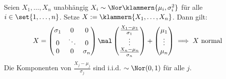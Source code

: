 \begin{beispiel}\label{beisp5.2}
	Seien $X_1,\ldots,X_n$ unabhängig $X_i\sim\Nor\klammern{\mu_i,\sigma_i^2}$ für alle $i\in\set{1,\ldots,n}$.
	Setze $X:=\klammern{X_1,\ldots,X_n}$.
	Dann gilt:
	\begin{align*}
		X
		\overset{}{=}
		\begin{pmatrix}
			\sigma_1 & 0 & 0\\
			0 & \ddots & 0\\
			0 & 0 & \sigma_n
		\end{pmatrix}\mal\begin{pmatrix}
			\frac{X_1-\mu_1}{\sigma_1}\\
			\vdots\\
			\frac{X_n-\mu_n}{\sigma_n}
		\end{pmatrix}
		+\begin{pmatrix}
			\mu_1\\
			\vdots\\
			\mu_n
		\end{pmatrix}
		\implies X\text{ normal}
	\end{align*}
	Die Komponenten von $\frac{X_j-\mu_j}{\sigma_j}$ sind i.i.d. $\sim\Nor(0,1)$ für alle $j$.
\end{beispiel}

